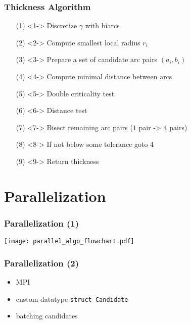 \documentclass{beamer}
\begin{document}
\begin{frame}
\frametitle{Thickness Algorithm}
\begin{itemize}
\item[(1)]<1-> Discretize $\gamma$ with biarcs
\item[(2)]<2-> Compute smallest local radius $r_i$
\item[(3)]<3-> Prepare a set of candidate arc pairs $(a_i,b_i)$
\item[(4)]<4-> Compute minimal distance between arcs
\item[(5)]<5-> Double criticality test
\item[(6)]<6-> Distance test
\item[(7)]<7-> Bisect remaining arc pairs ($1$ pair -> $4$ pairs)
\item[(8)]<8-> If not below some tolerance goto 4
\item[(9)]<9-> Return thickness
\end{itemize}
\end{frame}

\section{Parallelization}

\begin{frame}
\frametitle{Parallelization (1)}
\texttt{[image: parallel\_algo\_flowchart.pdf]}
\end{frame}

\begin{frame}
\frametitle{Parallelization (2)}
\begin{itemize}
\item<1-> MPI
\item<2-> custom datatype \texttt{struct Candidate}
\item<3-> batching candidates
\end{itemize}
\end{frame}
\end{document}
